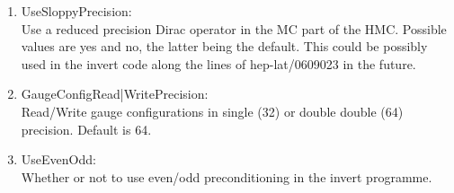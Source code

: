 \begin{enumerate}
\item {\ttfamily UseSloppyPrecision}:\\
  Use a reduced precision Dirac operator in the MC part of the
  HMC. Possible values are yes and no, the latter being the
  default. This could be possibly used in the invert code along the 
  lines of {\ttfamily hep-lat/0609023} in the future.

\item {\ttfamily GaugeConfigRead|WritePrecision}:\\
  Read/Write gauge configurations in single (32) or double double (64)
  precision. Default is 64.

\item {\ttfamily UseEvenOdd}:\\
  Whether or not to use even/odd preconditioning in the invert
  programme.

\end{enumerate}

